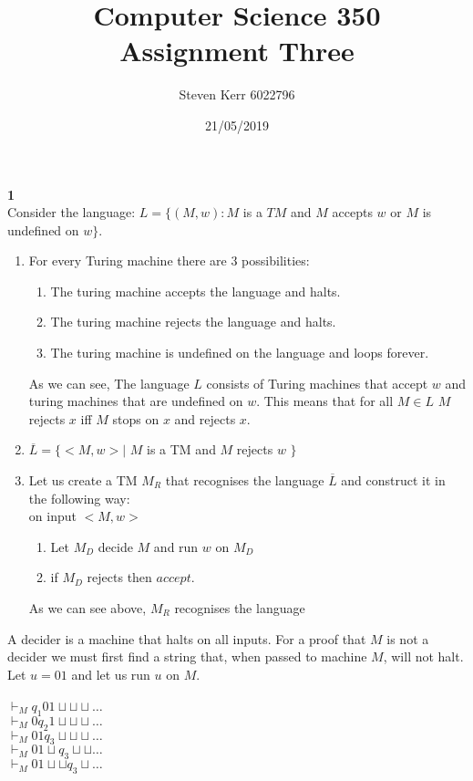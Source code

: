 \documentclass[a4paper,12pt]{article}
\title{Computer Science 350 \\
\large Assignment Three}
\author{Steven Kerr 6022796}
\date{21/05/2019}
\begin{document}
\maketitle

\noindent \textbf{1} \\
Consider the language: $L=\{(M,w) : M$ is a $TM$ and $M$ accepts $w$ or $M$ is undefined on $w\}$.
\noindent \begin{enumerate}[label=\alph*)]
\item For every Turing machine there are 3 possibilities:
\begin{enumerate}
\item The turing machine accepts the language and halts.
\item The turing machine rejects the language and halts.
\item The turing machine is undefined on the language and loops forever.
\end{enumerate}
As we can see, The language $L$ consists of Turing machines that accept $w$ and turing machines that are undefined on $w$. This means that for all $M \in L$ $M$ rejects $x$ iff $M$ stops on $x$ and rejects $x$.
\item $\overline{L}=\{ <M, w> |$ $M$ is a TM and $M$ rejects $w$ $\}$ 
\item Let us create a TM $M_R$ that recognises the language $\overline{L}$ and construct it in the following way: \\
on input $<M, w>$
\begin{enumerate}
\item Let $M_D$ decide $M$ and run $w$ on $M_D$
\item if $M_D$ rejects then $accept$.
\end{enumerate}
As we can see above, $M_R$ recognises the language 
\end{enumerate}
A decider is a machine that halts on all inputs. For a proof that $M$ is not a decider we must first find a string that, when passed to machine $M$, will not halt. \\
Let $u=01$ and let us run $u$ on $M$. \\
\\
$\vdash_M q_1 0 1 \sqcup \sqcup \sqcup \dots$ \\
$\vdash_M 0 q_2 1 \sqcup \sqcup \sqcup \dots$ \\
$\vdash_M 0 1 q_3 \sqcup \sqcup \sqcup \dots$ \\
$\vdash_M 0 1 \sqcup q_3 \sqcup \sqcup \dots$ \\
$\vdash_M 0 1 \sqcup \sqcup q_3 \sqcup \dots$ \\
\end{document}
